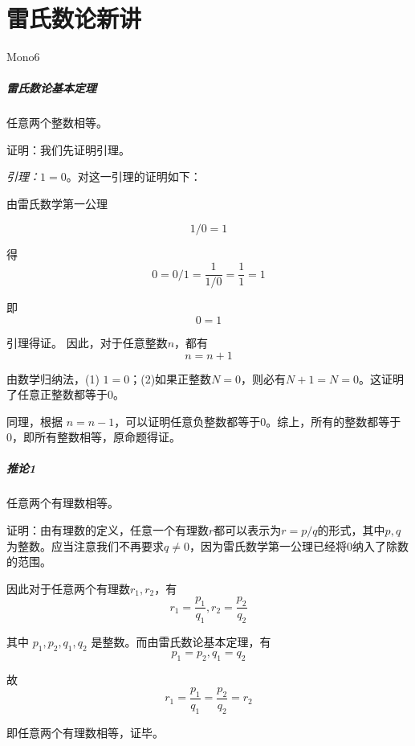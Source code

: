 \documentclass[UTF8,12pt,oneside]{ctexbook}
\begin{document}
\section{雷氏数论新讲}
\begin{center}
    Mono6
\end{center}

\subparagraph{雷氏数论基本定理}
任意两个整数相等。

证明：我们先证明引理。

\textit{引理：}$1=0$。对这一引理的证明如下：

由雷氏数学第一公理

\begin{equation}
    1/0=1
\end{equation}

得
\begin{equation}
   0=0/1=\frac{1}{1/0}=\frac{1}{1}=1
\end{equation}

即
\begin{equation}
    0=1
\end{equation}

引理得证。
因此，对于任意整数$n$，都有
\begin{equation}
    n=n+1
\end{equation}

由数学归纳法，(1) $1=0$；(2)如果正整数$N=0$，则必有$N+1=N=0$。这证明了任意正整数都等于0。

同理，根据 $n=n-1$，可以证明任意负整数都等于0。综上，所有的整数都等于0，即所有整数相等，原命题得证。

\subparagraph{推论1}任意两个有理数相等。

证明：由有理数的定义，任意一个有理数$r$都可以表示为$r=p/q$的形式，其中$p,q$为整数。应当注意我们不再要求$q\neq0$，因为雷氏数学第一公理已经将0纳入了除数的范围。

因此对于任意两个有理数$r_1,r_2$，有
\begin{equation}
    r_1=\frac{p_1}{q_1}, r_2=\frac{p_2}{q_2}
\end{equation}

其中 $p_1,p_2,q_1,q_2$ 是整数。而由雷氏数论基本定理，有
\begin{equation}
    p_1=p_2, q_1=q_2
\end{equation}

故
\begin{equation}
    r_1=\frac{p_1}{q_1}=\frac{p_2}{q_2}=r_2
\end{equation}

即任意两个有理数相等，证毕。
\end{document}
